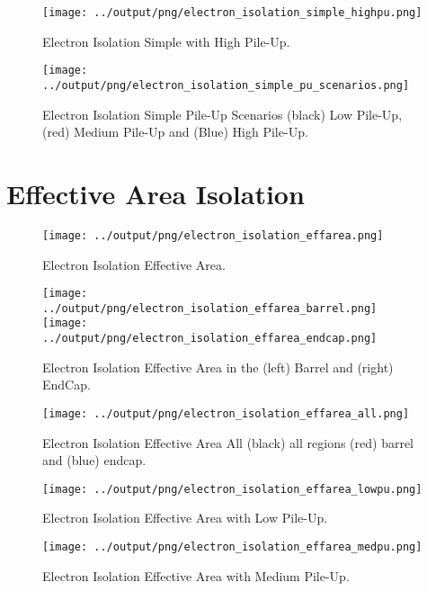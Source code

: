 \documentclass[11pt]{book}
\begin{document}
\begin{figure}[htbp]
\centering
\texttt{[image: ../output/png/electron\_isolation\_simple\_highpu.png]}
\caption{Electron Isolation Simple with High Pile-Up.}
\label{fig:electron_isolation_simple_highpu}
\end{figure}

\begin{figure}[htbp]
\centering
\texttt{[image: ../output/png/electron\_isolation\_simple\_pu\_scenarios.png]}
\caption{Electron Isolation Simple Pile-Up Scenarios (black) Low Pile-Up, (red) Medium Pile-Up and (Blue) High Pile-Up.}
\label{fig:electron_isolation_simple_pu_scenarios}
\end{figure}
\clearpage


\section{Effective Area Isolation}

\begin{figure}[htbp]
\centering
\texttt{[image: ../output/png/electron\_isolation\_effarea.png]}
\caption{Electron Isolation Effective Area.}
\label{fig:electron_isolation_effarea}
\end{figure}

\begin{figure}[htbp]
\centering
\texttt{[image: ../output/png/electron\_isolation\_effarea\_barrel.png]}
\texttt{[image: ../output/png/electron\_isolation\_effarea\_endcap.png]}
\caption{Electron Isolation Effective Area in the (left) Barrel and (right) EndCap.}
\label{fig:electron_isolation_effarea_regions}
\end{figure}

\begin{figure}[htbp]
\centering
\texttt{[image: ../output/png/electron\_isolation\_effarea\_all.png]}
\caption{Electron Isolation Effective Area All (black) all regions (red) barrel and (blue) endcap.}
\label{fig:electron_isolation_effarea_all}
\end{figure}

\begin{figure}[htbp]
\centering
\texttt{[image: ../output/png/electron\_isolation\_effarea\_lowpu.png]}
\caption{Electron Isolation Effective Area with Low Pile-Up.}
\label{fig:electron_isolation_effarea_lowpu}
\end{figure}

\begin{figure}[htbp]
\centering
\texttt{[image: ../output/png/electron\_isolation\_effarea\_medpu.png]}
\caption{Electron Isolation Effective Area with Medium Pile-Up.}
\label{fig:electron_isolation_effarea_medpu}
\end{figure}
\end{document}
